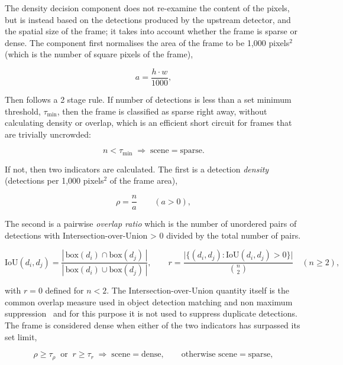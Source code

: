 The density decision component does not re-examine the content of the pixels, but is instead based on the detections produced by the upstream detector, and the spatial size of the frame; it takes into account whether the frame is sparse or dense. The component first normalises the area of the frame to be 1{,}000 pixels$^2$ (which is the number of square pixels of the frame),

\begin{equation}
	a = \frac{h \cdot w}{1000},
\end{equation}

Then follows a 2 stage rule. If number of detections is less than a set minimum threshold, $\tau_{\min}$, then the frame is classified as sparse right away, without calculating density or overlap, which is an efficient short circuit for frames that are trivially uncrowded:

\begin{equation}
	n < \tau_{\min} \;\Rightarrow\; \text{scene} = \text{sparse}.
\end{equation}

If not, then two indicators are calculated. The first is a detection \emph{density} (detections per 1{,}000 pixels$^2$ of the frame area),

\begin{equation}
	\rho = \frac{n}{a} \qquad (a>0),
\end{equation}

The second is a pairwise \emph{overlap ratio} which is the number of unordered pairs of detections with Intersection-over-Union > 0 divided by the total number of pairs.

\begin{equation}
	\text{IoU}(d_i,d_j) = \frac{|\,\text{box}(d_i) \cap \text{box}(d_j)\,|}{|\,\text{box}(d_i) \cup \text{box}(d_j)\,|}, \qquad
	r = \frac{\bigl|\{(d_i,d_j) : \text{IoU}(d_i,d_j) > 0\}\bigr|}{\binom{n}{2}} \quad (n \ge 2),
\end{equation}


with $r = 0$ defined for $n<2$. The Intersection-over-Union quantity itself is the common overlap measure used in object detection matching and non maximum suppression~\cite{everingham2010voc} and for this purpose it is not used to suppress duplicate detections. The frame is considered dense when either of the two indicators has surpassed its set limit,

\begin{equation}
	\rho \ge \tau_{\rho} \;\;\text{or}\;\; r \ge \tau_{r} \;\Rightarrow\; \text{scene} = \text{dense}, \qquad \text{otherwise scene} = \text{sparse},
\end{equation}

